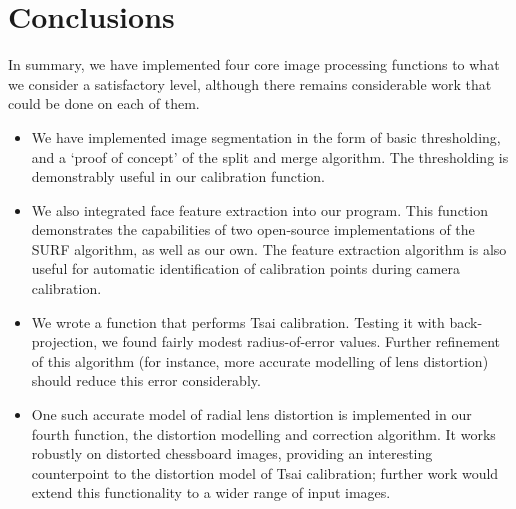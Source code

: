 
\section{Conclusions}
\label{sec:conclusions}

In summary, we have implemented four core image processing functions to what we consider a satisfactory level, although there remains considerable work that could be done on each of them.
\begin{itemize}
  \item We have implemented image segmentation in the form of basic thresholding, and a `proof of concept' of the split and merge algorithm. The thresholding is demonstrably useful in our calibration function.
  \item We also integrated face feature extraction into our program. This function demonstrates the capabilities of two open-source implementations of the SURF algorithm, as well as our own. The feature extraction algorithm is also useful for automatic identification of calibration points during camera calibration.
  \item We wrote a function that performs Tsai calibration. Testing it with back-projection, we found fairly modest radius-of-error values. Further refinement of this algorithm (for instance, more accurate modelling of lens distortion) should reduce this error considerably.
  \item One such accurate model of radial lens distortion is implemented in our fourth function, the distortion modelling and correction algorithm. It works robustly on distorted chessboard images, providing an interesting counterpoint to the distortion model of Tsai calibration; further work would extend this functionality to a wider range of input images.
\end{itemize}
